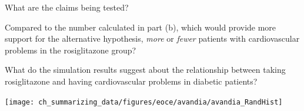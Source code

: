 {\begin{parts}
\begin{subparts}
\item What are the claims being tested?
\item Compared to the number calculated in part (b), which would provide more support for the alternative hypothesis,  \textit{more} or \textit{fewer} patients with cardiovascular problems in the rosiglitazone group?
\item What do the simulation results suggest about the relationship between taking rosiglitazone and having cardiovascular problems in diabetic patients?
\end{subparts}
\begin{center}
\texttt{[image: ch\_summarizing\_data/figures/eoce/avandia/avandia\_RandHist]} \\
\end{center}
\end{parts}
}{}


